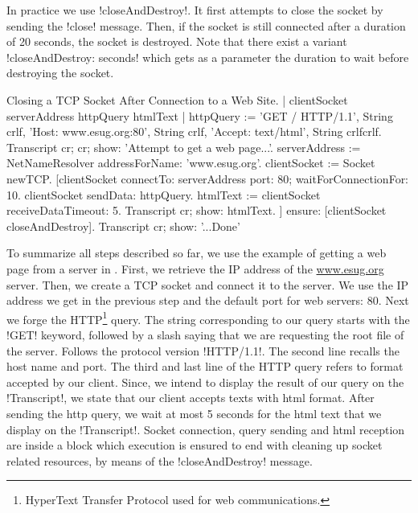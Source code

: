 \documentclass[a4paper,10pt,twoside]{book}
\begin{document}
In practice we use \ct!closeAndDestroy!. It first attempts to close the socket by sending the \ct!close! message.
Then, if the socket is still connected after a duration of 20 seconds, the socket is destroyed.
Note that there exist a variant \ct!closeAndDestroy: seconds! which gets as a parameter the duration to wait before destroying the socket.

\begin{script}{Closing a TCP Socket After Connection to a Web Site.}
| clientSocket serverAddress httpQuery htmlText |
httpQuery := 'GET / HTTP/1.1', String crlf, 
	'Host: www.esug.org:80', String crlf, 
	'Accept: text/html', String crlfcrlf.
Transcript cr; cr; show: 'Attempt to get a web page...'.
serverAddress := NetNameResolver addressForName: 'www.esug.org'.
clientSocket := Socket newTCP.
[clientSocket 
	connectTo: serverAddress port: 80;
	waitForConnectionFor: 10.
 clientSocket sendData: httpQuery.
 htmlText  := clientSocket receiveDataTimeout: 5.
 Transcript cr; show: htmlText.
] ensure: [clientSocket closeAndDestroy].
Transcript cr; show: '...Done'
\end{script}

To summarize all steps described so far, we use the example of getting a web page from a server in .
First, we retrieve the IP address of the \url{www.esug.org} server.
Then, we create a TCP socket and connect it to the server.
We use the IP address we get in the previous step and the default port for web servers: 80.
Next we forge the HTTP\footnote{HyperText Transfer Protocol used for web communications.} query.
The string corresponding  to our query starts with the \ct!GET! keyword, followed by a slash saying that we are requesting the root file of the server.
Follows the protocol version \ct!HTTP/1.1!.
The second line recalls the host name and port.
The third and last line of the HTTP query refers to format accepted by our client. 
Since, we intend to display the result of our query on the \ct!Transcript!, we state that our client accepts texts with html format.
After sending the http query, we wait at most 5 seconds for the html text that we display on the \ct!Transcript!.
Socket connection, query sending and html reception are inside a block which execution is ensured to end with cleaning up socket related resources, by means of the \ct!closeAndDestroy! message.
\end{document}
